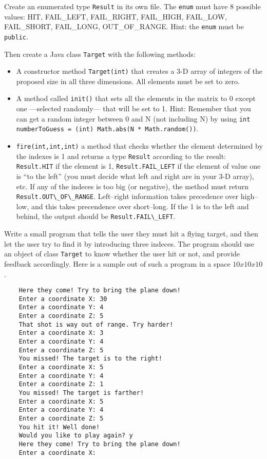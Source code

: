 \documentclass{article}
\begin{document}
Create an enumerated type \verb+Result+ in its own file. The
\verb+enum+ must have 8 possible values: HIT, FAIL\_LEFT, FAIL\_RIGHT,
FAIL\_HIGH, FAIL\_LOW, FAIL\_SHORT, FAIL\_LONG, OUT\_OF\_RANGE. Hint:
the \verb+enum+ must be \verb+public+.

Then create a Java class \verb+Target+ with the following methods: 

\begin{itemize}
\item A constructor method \verb+Target(int)+ that creates a 3-D array 
  of integers of the
  proposed size in all three dimensions. All elements must be set to
  zero.
\item A method called \verb+init()+ 
  that sets all the elements in the matrix to 0 except one
  ---selected randomly--- that will be set to 1. 
  Hint: Remember that you can get a random
  integer between 0 and N (not including N) by
  using \verb+int numberToGuess = (int) Math.abs(N * Math.random())+.
\item \verb+fire(int,int,int)+ a method that checks whether the
  element determined by the indexes is 1 and returns a type
  \verb+Result+ according to the result: \verb+Result.HIT+ if the
  element is 1, \verb+Result.FAIL_LEFT+ if the element of value one is
  ``to the left'' (you must decide what left and right are in your 3-D
  array), etc. If any of the indeces is too big (or negative), the
  method must return \verb+Result.OUT\_OF\_RANGE+. Left--right
  information takes precedence over high--low, and this takes
  precendence over short--long. If the 1 is to the left and behind,
  the output should be \verb+Result.FAIL\_LEFT+.
\end{itemize}

Write a small program that tells the user they must hit a flying
target, and then let the user try to find it by introducing three
indeces. The program should use an object of class \verb+Target+ to
know whether the user hit or not, and provide feedback
accordingly. Here is a sample out of such a program in a space $10 x
10 x 10$. 

\begin{verbatim}
    Here they come! Try to bring the plane down!
    Enter a coordinate X: 30
    Enter a coordinate Y: 4
    Enter a coordinate Z: 5
    That shot is way out of range. Try harder!
    Enter a coordinate X: 3
    Enter a coordinate Y: 4
    Enter a coordinate Z: 5
    You missed! The target is to the right!
    Enter a coordinate X: 5
    Enter a coordinate Y: 4
    Enter a coordinate Z: 1
    You missed! The target is farther!
    Enter a coordinate X: 5
    Enter a coordinate Y: 4
    Enter a coordinate Z: 5
    You hit it! Well done!
    Would you like to play again? y
    Here they come! Try to bring the plane down!
    Enter a coordinate X: 
\end{verbatim}
\end{document}
